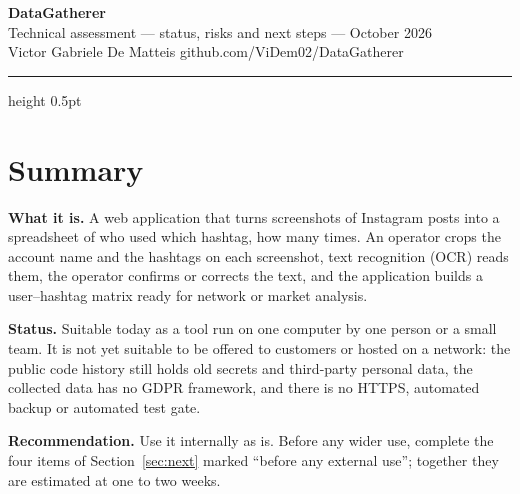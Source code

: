 \documentclass[10pt,a4paper]{scrartcl}
\renewcommand{\emph}[1]{\textcolor{accent}{#1}}
\newcommand{\RuleSection}[1]{%
    \section{#1}%
    \vspace{0.2em}{\color{accent!35}\hrule height 0.4pt}\vspace{0.3em}%
  }
\begin{document}

  \begin{center}
    {\Huge\bfseries\color{accent} DataGatherer}\\[0.25cm]
    {\small Technical assessment --- status, risks and next steps --- October 2026}\\[0.15cm]
    {\small Victor Gabriele De Matteis \quad\textbullet\quad github.com/ViDem02/DataGatherer}\\[0.2cm]
    {\color{accent!35}\hrule height 0.5pt}
  \end{center}

  \vspace{0.3em}


  \RuleSection{Summary}
  \label{sec:summary}

  \textbf{What it is.} A web application that turns screenshots of Instagram posts into a spreadsheet of who
  used which hashtag, how many times. An operator crops the account name and the hashtags on each screenshot,
  text recognition (OCR) reads them, the operator confirms or corrects the text, and the application builds
  a user--hashtag matrix ready for network or market analysis.

  \textbf{Status.} Suitable \emph{today} as a tool run on one computer by one person or a small team. It is
  \emph{not yet suitable} to be offered to customers or hosted on a network: the public code history still
  holds old secrets and third-party personal data, the collected data has no GDPR framework, and there is no
  HTTPS, automated backup or automated test gate.

  \textbf{Recommendation.} Use it internally as is. Before any wider use, complete the four items of
  Section~\ref{sec:next} marked ``before any external use''; together they are estimated at one to two weeks.
\end{document}
